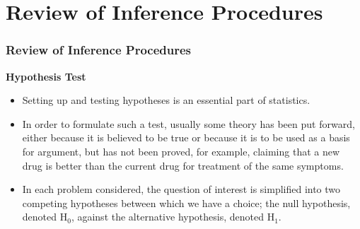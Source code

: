 \documentclass{beamer}
\begin{document}

\section{Review of Inference Procedures}
\begin{frame}
	\frametitle{Review of Inference Procedures}
\noindent \textbf{Hypothesis Test}
\begin{itemize}
	\item 	Setting up and testing hypotheses is an essential part of statistics.
	\item In order to formulate such a test, usually some theory has been put
	forward, either because it is believed to be true or because it is to
	be used as a basis for argument, but has not been proved, for
	example, claiming that a new drug is better than the current drug
	for treatment of the same symptoms.
	\item In each problem considered, the question of interest is simplified
	into two competing hypotheses between which we have a choice;
	the null hypothesis, denoted H$_0$, against the alternative hypothesis,
	denoted H$_1$.
\end{itemize}
 
\end{frame}
\end{document}
